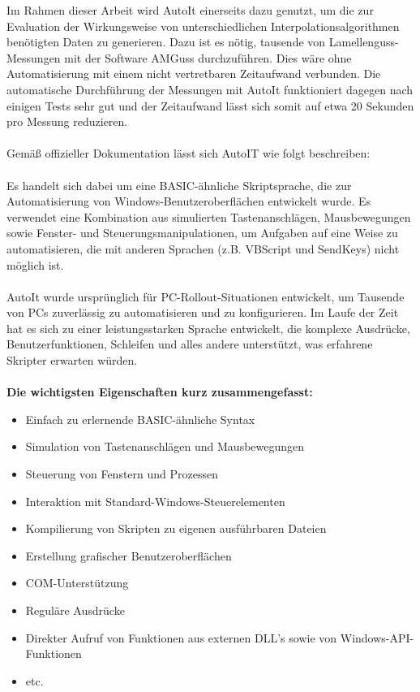 \documentclass[
fontsize=10pt, 
listof = totoc,
parskip = half	
]{report}
\begin{document}
Im Rahmen dieser Arbeit wird AutoIt einerseits dazu genutzt, um die zur Evaluation der Wirkungsweise von unterschiedlichen Interpolationsalgorithmen benötigten Daten zu generieren. Dazu ist es nötig, tausende von Lamellenguss-Messungen mit der Software AMGuss durchzuführen. Dies wäre ohne Automatisierung mit einem nicht vertretbaren Zeitaufwand verbunden. Die automatische Durchführung der Messungen mit AutoIt funktioniert dagegen nach einigen Tests sehr gut und der Zeitaufwand lässt sich somit auf etwa 20 Sekunden pro Messung reduzieren.
\\\\
\noindent Gemäß offizieller Dokumentation \cite{AutoItDocs} lässt sich AutoIT wie folgt beschreiben:
\\\\
\noindent Es handelt sich dabei um eine BASIC-ähnliche Skriptsprache, die zur Automatisierung von Windows-Benutzeroberflächen entwickelt wurde. Es verwendet eine Kombination aus simulierten Tastenanschlägen, Mausbewegungen sowie Fenster- und Steuerungsmanipulationen, um Aufgaben auf eine Weise zu automatisieren, die mit anderen Sprachen (z.B. VBScript und SendKeys) nicht möglich ist.
\\\\
\noindent AutoIt wurde ursprünglich für PC-Rollout-Situationen entwickelt, um Tausende von PCs zuverlässig zu automatisieren und zu konfigurieren. Im Laufe der Zeit hat es sich zu einer leistungsstarken Sprache entwickelt, die komplexe Ausdrücke, Benutzerfunktionen, Schleifen und alles andere unterstützt, was erfahrene Skripter erwarten würden. 
\\\\
\textbf{Die wichtigsten Eigenschaften kurz zusammengefasst:}
\begin{itemize}
	\item Einfach zu erlernende BASIC-ähnliche Syntax
	\item Simulation von Tastenanschlägen und Mausbewegungen
	\item Steuerung von Fenstern und Prozessen
	\item Interaktion mit Standard-Windows-Steuerelementen
	\item Kompilierung von Skripten zu eigenen ausführbaren Dateien
	\item Erstellung grafischer Benutzeroberflächen
	\item COM-Unterstützung
	\item Reguläre Ausdrücke
	\item Direkter Aufruf von Funktionen aus externen DLL's sowie von Windows-API-Funktionen
	\item etc.
\end{itemize}
\end{document}
